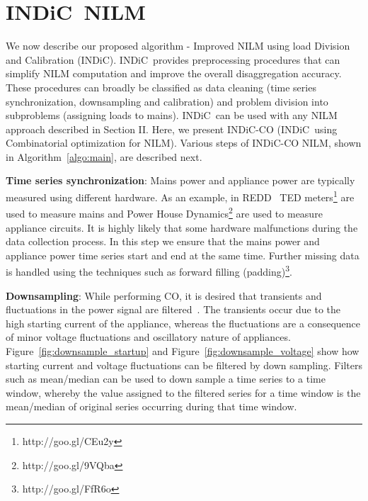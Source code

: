 \documentclass[conference]{IEEEtran}
\newcommand{\figref}[1]{Figure~\ref{#1}}
\newcommand{\algoref}[1]{Algorithm~\ref{#1}}
\newcommand{\indic}{INDiC~}
\newcommand{\indicns}{INDiC}
\begin{document}
\vspace{-2mm}
\section{\indic NILM}
\vspace{-1mm}
\noindent We now describe our proposed algorithm - Improved NILM using load Division and Calibration (\indicns). \indic provides preprocessing procedures that can simplify NILM computation and improve the overall disaggregation accuracy. These procedures can broadly be classified as data cleaning (time series synchronization, downsampling and calibration) and problem division into subproblems (assigning loads to mains). \indic can be used with any NILM approach described in Section II. Here, we present \indicns-CO (\indic using Combinatorial optimization for NILM). %
Various steps of \indicns-CO NILM, shown in \algoref{algo:main}, are described next. 

\noindent\textbf{Time series synchronization}: Mains power and appliance power are typically measured using different hardware. As an example, in REDD~\cite{redd} TED meters\footnote{http://goo.gl/CEu2y} are used to measure mains and Power House Dynamics\footnote{http://goo.gl/9VQba} are used to measure appliance circuits. It is highly likely that some hardware malfunctions during the data collection process. In this step we ensure that the mains power and appliance power time series start and end at the same time. Further missing data is handled using the techniques such as forward filling (padding)\footnote{http://goo.gl/FfR6o}.

\noindent\textbf{Downsampling}: While performing CO, it is desired that transients and fluctuations in the power signal are filtered~\cite{hart}. The transients occur due to the high starting current of the appliance, whereas the fluctuations are a consequence of minor voltage fluctuations and oscillatory nature of appliances. \figref{fig:downsample_startup} and \figref{fig:downsample_voltage} show how starting current and voltage fluctuations can be filtered by down sampling. Filters such as mean/median can be used to down sample a time series to a time window, whereby the value assigned to the filtered series for a time window is the mean/median of original series occurring during that time window. 
\end{document}
